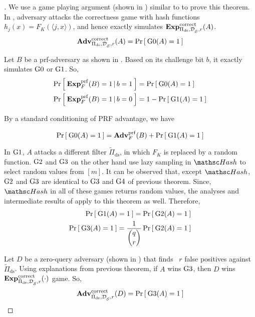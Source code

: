 \newcommand{\FK}{F_K(\langle j,x \rangle)}
\newcommand{\rhoK}{\rho(\langle j,x \rangle)}
\newcommand{\OK}{\calO(\langle j,x \rangle)}

\begin{proof}[]
We use a game playing argument (shown in ) similar to  to prove this theorem. In , adversary attacks the correctness game with  hash functions $h_j(x) = \FK $, and hence exactly simulates $\mathrm{\mathbf{Exp}}^{\mathrm{correct}}_{\Pi_{\mathrm{ds}},\mathcal{D}_{{\cal S}}^{},r}(A)$.
\begin{equation}
\mathrm{\mathbf{Adv}}^{\mathrm{correct}}_{\Pi_{\mathrm{ds}},\mathcal{D}_{{\cal S}}^{},r}(A) = \Pr\left[\: \text{G0}(A)=1 \:\right]\label{eq:2T0}
\end{equation}

Let $B$ be a prf-adversary as shown in . Based on its challenge bit $b$, it exactly simulates $\text{G0}$ or $\text{G1}$. So,
\begin{align*}
\Prob{\ExpPRF{F}{B} = 1\,|\,b=1} &= \Prob{\game{0}(A)=1} \\%
\Prob{\ExpPRF{F}{B} = 1\,|\,b=0} &= 1-\Prob{\game{1}(A)=1}
\end{align*}

By a standard conditioning of PRF advantage, we have

\begin{equation*}
\Prob{\game{0}(A)=1} = \AdvPRF{F}{B} + \Prob{\game{1}(A)=1}%
\end{equation*}

In $\text{G1}$, $A$ attacks a different filter $\tilde{\Pi}_\mathrm{ds}$, in which $F_K$ is replaced by a random function. $\text{G2}$ and $\text{G3}$ on the other hand use lazy sampling in $\Hash$ to select random values from $[m]$. It can be observed that, except  $\Hash$, $\text{G2}$ and $\text{G3}$ are identical to $\text{G3}$ and $\text{G4}$ of previous theorem. Since, $\Hash$ in all of these games returns random values, the analyses and intermediate results of  apply to this theorem as well. Therefore,
\begin{align*}
\Pr\left[\: \text{G1}(A)=1 \:\right] = \Pr\left[\: \text{G2}(A)=1 \:\right]\\
\Pr\left[\: \text{G3}(A)=1 \:\right] = \frac{1}{\dbinom{q}{r}}\Pr\left[\: \text{G2}(A)=1 \:\right]
\end{align*}

Let $D$ be a zero-query adversary (shown in ) that finds ~$r$ false positives against $\tilde{\Pi}_{\mathrm{ds}}$. Using explanations from previous theorem, if $A$ wins $\text{G3}$, then $D$ wins $\mathrm{\mathbf{Exp}}^{\mathrm{correct}}_{\tilde{\Pi}_{\mathrm{ds}},\mathcal{D}_{{\cal S}}^{},r}(\cdot)$ game. So, 
\begin{equation*}
\mathrm{\mathbf{Adv}}^{\mathrm{correct}}_{\tilde{\Pi}_{\mathrm{ds}},\mathcal{D}_{{\cal S}}^{},r}(D) = \Pr\left[\: \text{G3}(A) = 1 \:\right]\label{eq:2T8}
\end{equation*}


\end{proof}
